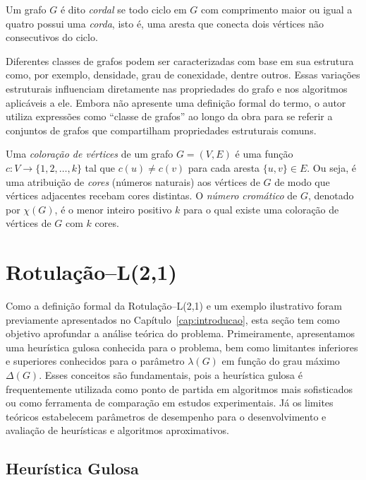 Um grafo $G$ é dito \emph{cordal} se todo ciclo em $G$ com comprimento maior ou igual a quatro possui uma \emph{corda}, isto é, uma aresta que conecta dois vértices não consecutivos do ciclo.

Diferentes classes de grafos podem ser caracterizadas com base em sua estrutura como, por exemplo, densidade, grau de conexidade, dentre outros. Essas variações estruturais influenciam diretamente nas propriedades do grafo e nos algoritmos aplicáveis a ele. Embora  não apresente uma definição formal do termo, o autor utiliza expressões como “classe de grafos” ao longo da obra para se referir a conjuntos de grafos que compartilham propriedades estruturais comuns.

Uma \emph{coloração de vértices} de um grafo \( G = (V, E) \) é uma função \( c: V \to \{1, 2, \ldots, k\} \) tal que \( c(u) \neq c(v) \) para cada aresta \( \{u, v\} \in E \). Ou seja, é uma atribuição de \emph{cores} (números naturais) aos vértices de \( G \) de modo que vértices adjacentes recebam cores distintas. O \emph{número cromático} de \( G \), denotado por \( \chi(G) \), é o menor inteiro positivo \( k \) para o qual existe uma coloração de vértices de \( G \) com \( k \) cores.

\section{Rotulação–L(2,1)}

Como a definição formal da Rotulação–L(2,1) e um exemplo ilustrativo foram previamente apresentados no Capítulo~\ref{cap:introducao}, esta seção tem como objetivo aprofundar a análise teórica do problema. Primeiramente, apresentamos uma heurística gulosa conhecida para o problema, bem como limitantes inferiores e superiores conhecidos para o parâmetro $\lambda(G)$ em função do grau máximo $\Delta(G)$. Esses conceitos são fundamentais, pois a heurística gulosa é frequentemente utilizada como ponto de partida em algoritmos mais sofisticados ou como ferramenta de comparação em estudos experimentais. Já os limites teóricos estabelecem parâmetros de desempenho para o desenvolvimento e avaliação de heurísticas e algoritmos aproximativos.

\subsection{Heurística Gulosa}

